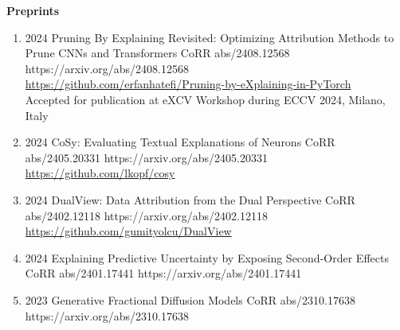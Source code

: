 \headedsection %
{\bf Preprints}{}
{
    \begin{enumerate}

        \item {}
                        {2024}
                        {Pruning By Explaining Revisited: Optimizing Attribution Methods to Prune CNNs and Transformers}
                        {CoRR abs/2408.12568}
                        {https://arxiv.org/abs/2408.12568}
                        {\\\href{https://github.com/erfanhatefi/Pruning-by-eXplaining-in-PyTorch}{https://github.com/erfanhatefi/Pruning-by-eXplaining-in-PyTorch}\\
                        Accepted for publication at eXCV Workshop during ECCV 2024, Milano, Italy}

        \item {}
                        {2024}
                        {CoSy: Evaluating Textual Explanations of Neurons}
                        {CoRR abs/2405.20331}
                        {https://arxiv.org/abs/2405.20331}
                        {\\ \href{https://github.com/lkopf/cosy}{https://github.com/lkopf/cosy}}

        \item {}
                        {2024}
                        {DualView: Data Attribution from the Dual Perspective}
                        {CoRR abs/2402.12118}
                        {https://arxiv.org/abs/2402.12118}
                        {\\\href{https://github.com/gumityolcu/DualView}{https://github.com/gumityolcu/DualView}}

        \item {}
                        {2024}
                        {Explaining Predictive Uncertainty by Exposing Second-Order Effects}
                        {CoRR abs/2401.17441}
                        {https://arxiv.org/abs/2401.17441}

        \item {}
                        {2023}
                        {Generative Fractional Diffusion Models}
                        {CoRR abs/2310.17638}
                        {https://arxiv.org/abs/2310.17638}


\end{enumerate}}
